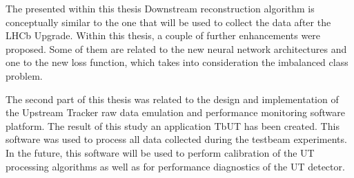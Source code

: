 The presented within this thesis Downstream reconstruction algorithm is conceptually similar to the one that will be used to collect the data after the LHCb Upgrade.  Within this thesis, a couple of further enhancements were proposed. Some of them are related to the new neural network architectures and one to the new loss function, which takes into consideration the imbalanced class problem.

The second part of this thesis was related to the design and implementation of the Upstream Tracker raw data emulation and performance monitoring software platform.  The result of this study an application TbUT has been created. This software was used to process all data collected during the testbeam experiments. In the future, this software will be used to perform calibration of the UT processing algorithms as well as for performance diagnostics of the UT detector.  